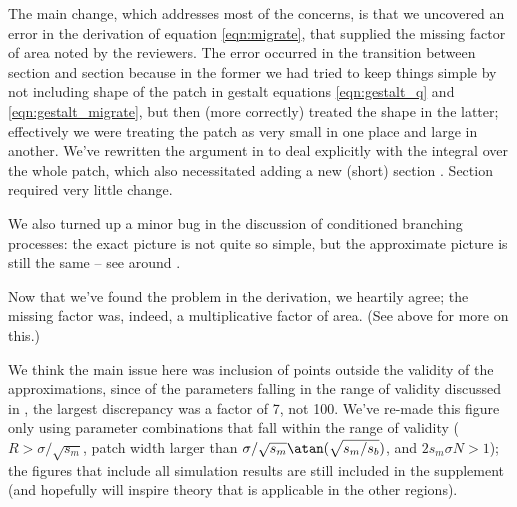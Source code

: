 The main change,
which addresses most of the concerns,
is that we uncovered an error in the derivation of equation \eqref{eqn:migrate},
that supplied the missing factor of area noted by the reviewers.
The error occurred in the transition between section  
and section 
because in the former we had tried to keep things simple
by not including shape of the patch in
gestalt equations \eqref{eqn:gestalt_q} and \eqref{eqn:gestalt_migrate},
but then (more correctly) treated the shape in the latter;
effectively we were treating the patch as very small in one place
and large in another.
We've rewritten the argument in  
to deal explicitly with the integral over the whole patch,
which also necessitated adding a new (short) section .
Section  required very little change.

We also turned up a minor bug in the discussion of conditioned branching processes:
the exact picture is not quite so simple,
but the approximate picture is still the same --
see around .



\reviewersection


\reply
Now that we've found the problem in the derivation,
we heartily agree;
the missing factor was, indeed, a multiplicative factor of area.
(See above for more on this.)



\reply
We think the main issue here was inclusion of points outside the validity of the approximations,
since of the parameters falling in the range of validity discussed in ,
the largest discrepancy was a factor of 7, not 100.
We've re-made this figure only using parameter combinations that fall within the range of validity
($R > \sigma/\sqrt{s_m}$, patch width larger than $\sigma/\sqrt{s_m} \atan(\sqrt{s_m/s_b})$, and $2 s_m \sigma N > 1$);
the figures that include all simulation results are still included in the supplement
(and hopefully will inspire theory that is applicable in the other regions).

